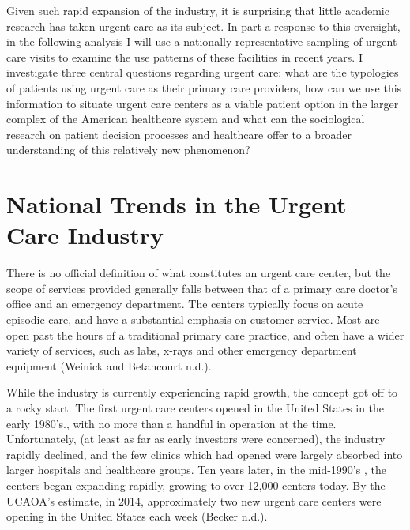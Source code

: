 \documentclass[12pt,twoside]{reedthesis}
\begin{document}
  Given such rapid expansion of the industry, it is surprising that little
  academic research has taken urgent care as its subject. In part a
  response to this oversight, in the following analysis I will use a
  nationally representative sampling of urgent care visits to examine the
  use patterns of these facilities in recent years. I investigate three
  central questions regarding urgent care: what are the typologies of
  patients using urgent care as their primary care providers, how can we
  use this information to situate urgent care centers as a viable patient
  option in the larger complex of the American healthcare system and what
  can the sociological research on patient decision processes and
  healthcare offer to a broader understanding of this relatively new
  phenomenon?
  
  \section*{National Trends in the Urgent Care
  Industry}\label{national-trends-in-the-urgent-care-industry}
  
  There is no official definition of what constitutes an urgent care
  center, but the scope of services provided generally falls between that
  of a primary care doctor's office and an emergency department. The
  centers typically focus on acute episodic care, and have a substantial
  emphasis on customer service. Most are open past the hours of a
  traditional primary care practice, and often have a wider variety of
  services, such as labs, x-rays and other emergency department equipment
  (Weinick and Betancourt n.d.).
  
  While the industry is currently experiencing rapid growth, the concept
  got off to a rocky start. The first urgent care centers opened in the
  United States in the early 1980's., with no more than a handful in
  operation at the time. Unfortunately, (at least as far as early
  investors were concerned), the industry rapidly declined, and the few
  clinics which had opened were largely absorbed into larger hospitals and
  healthcare groups. Ten years later, in the mid-1990's , the centers
  began expanding rapidly, growing to over 12,000 centers today. By the
  UCAOA's estimate, in 2014, approximately two new urgent care centers
  were opening in the United States each week (Becker n.d.).
  
\end{document}
